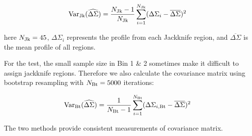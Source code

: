 \documentclass[fleqn,usenatbib,useAMS,english]{mnras}
\begin{document}
    \begin{equation}
        \mathrm{Var}_{\rm Jk}(\widehat{\Delta\Sigma}) = \frac{N_{\rm Jk} - 1}{N_{\rm Jk}} \sum\limits_{i=1}^{N_{\rm Jk}} (\Delta\Sigma_{i} - \overline{\Delta\Sigma})^2
    \end{equation}

    \noindent here $N_{\rm Jk}=45$, $\Delta\Sigma_{i}$ represents the \dsigma{} profile from each
    Jackknife region, and $\overline{\Delta\Sigma}$ is the mean profile of all regions.

    For the \topn{} test, the small sample size in Bin 1 \& 2 sometimes make it difficult to assign
    jackknife regions. Therefore we also calculate the covariance matrix using bootstrap resampling
    with $N_{\rm Bt}=5000$ iterations:

    \begin{equation}
        \mathrm{Var}_{\rm Bt}(\widehat{\Delta\Sigma}) = \frac{1}{N_{\rm Bt} - 1} \sum\limits_{i=1}^{N_{\rm Bt}} (\Delta\Sigma_{i, \rm Bt} - \overline{\Delta\Sigma})^2
    \end{equation}

    \noindent The two methods provide consistent measurements of covariance matrix.
\end{document}

